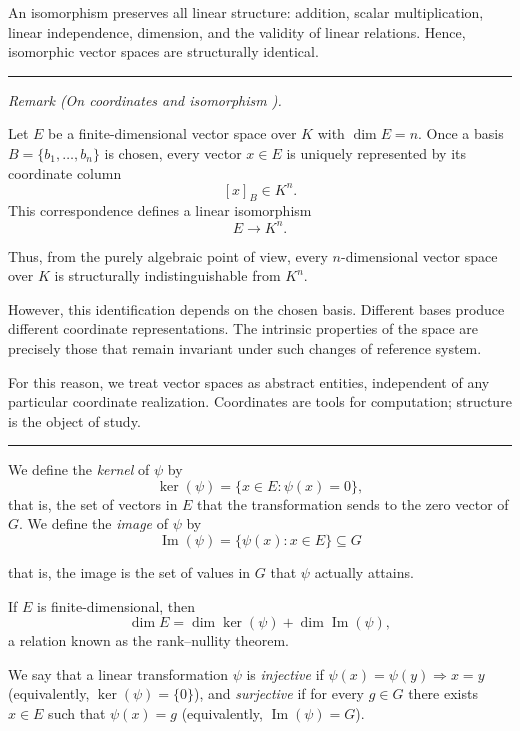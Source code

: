 \medskip

An isomorphism preserves all linear structure:
addition, scalar multiplication, linear independence, dimension,
and the validity of linear relations.
Hence, isomorphic vector spaces are structurally identical.

\bigskip
\hrule
\medskip


\textit{Remark (On coordinates and isomorphism \cite{halmos}).}

Let $E$ be a finite-dimensional vector space over $K$ with $\dim E = n$.
Once a basis $B=\{b_1,\dots,b_n\}$ is chosen, every vector $x\in E$
is uniquely represented by its coordinate column
\[
[x]_B \in K^n.
\]
This correspondence defines a linear isomorphism
\[
E \longrightarrow K^n.
\]

\medskip

Thus, from the purely algebraic point of view, every $n$-dimensional
vector space over $K$ is structurally indistinguishable from $K^n$.

\medskip

However, this identification depends on the chosen basis.
Different bases produce different coordinate representations.
The intrinsic properties of the space are precisely those
that remain invariant under such changes of reference system.

\medskip

For this reason, we treat vector spaces as abstract entities,
independent of any particular coordinate realization.
Coordinates are tools for computation; structure is the object of study.

\medskip
\hrule
\bigskip

We define the \emph{kernel} of $\psi$ by
\[
    \ker(\psi)=\{x\in E:\psi(x)=0\},
\]
that is, the set of vectors in $E$ that the transformation sends to the zero vector of $G$. We define the \emph{image} of $\psi$ by
\[
\operatorname{Im}(\psi)=\{\psi(x):x\in E\}\subseteq G
\]

that is, the image is the set of values in $G$ that $\psi$ actually attains.

\medskip

If $E$ is finite-dimensional, then
\[
\dim E = \dim \ker(\psi) + \dim \operatorname{Im}(\psi),
\]
a relation known as the rank--nullity theorem.

\medskip

We say that a linear transformation $\psi$ is \emph{injective} if $\psi(x)=\psi(y)\Rightarrow x=y$ (equivalently, $\ker(\psi)=\{0\}$), and \emph{surjective} if for every $g\in G$ there exists $x\in E$ such that $\psi(x)=g$ (equivalently, $\operatorname{Im}(\psi)=G$).

